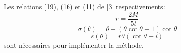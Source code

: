 Les relations (19), (16) et (11) de [3] respectivements: 
\[
r=\dfrac{2M}{5t}
\]
\[
\sigma(\theta)=\theta+(\theta\cot\theta-1)\cot\theta
\] 
\[
s(\theta)=r\theta(\cot\theta+i)
\]
sont nécessaires pour implémenter la méthode.


